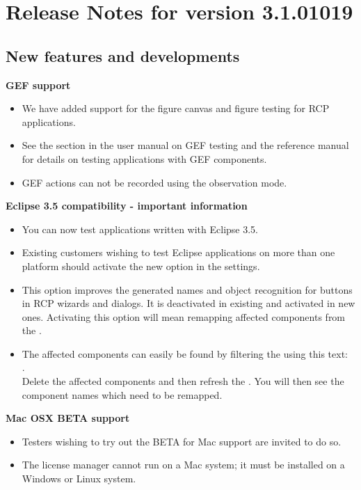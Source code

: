 \makeatletter
\section{Release Notes for version 3.1.01019}
\makeatother

\subsection{New features and developments}

\textbf{GEF support}
\begin{itemize}
\item We have added support for the figure canvas and figure testing for RCP applications. 
\item See the section in the user manual on GEF testing and the reference manual for details on testing applications with GEF components. %
\item GEF actions can not be recorded using the observation mode. 
\end{itemize}

\textbf{Eclipse 3.5 compatibility - important information}
\begin{itemize}
\item You can now  test applications written with Eclipse 3.5. 
\item Existing customers wishing to test Eclipse applications on more than one platform should activate the new  option in the \gdaut{} settings.  %
\item This option improves the generated names and object recognition for buttons in RCP wizards and dialogs. It is deactivated in existing \gdprojects{} and activated in new ones. Activating this option will mean remapping affected components from the \gdaut{}.
\item The affected components can easily be found by filtering the \gdomeditor{} using this text: \\
. \\
Delete the affected components and then refresh the \gdomeditor{}. You will then see the component names which need to be remapped. 
\end{itemize}

\textbf{Mac OSX BETA support}
\begin{itemize}
\item Testers wishing to try out the BETA for Mac support are invited to do so. 
\item The license manager cannot run on a Mac system; it must be installed on a Windows or Linux system. 
\end{itemize}

